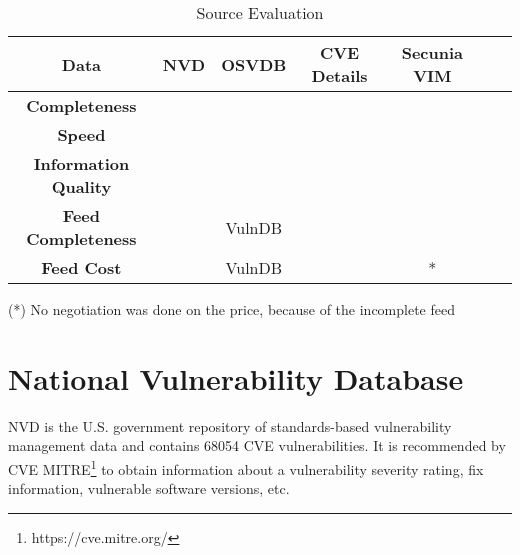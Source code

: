    
    \begin{table}
\begin{center}
    \begin{tabular}{ | c || c | c | c | c | c | c |}
    
    \hline
	 
      Data & \textbf{NVD}  &  \textbf{OSVDB} & \textbf{CVE Details} & \textbf{Secunia VIM} 
	\\ 
	\hline  
	\textbf{Completeness} & \multicolumn{1}{c|}{\cellcolor{yellow!25}\cmark} & \multicolumn{1}{c|}{\cellcolor{green!25}\cmark}
	& \multicolumn{1}{c|}{\cellcolor{yellow!25}\cmark}& \multicolumn{1}{c|}{\cellcolor{yellow!25}\cmark}
    \\ 
	\hline   
	 \textbf{Speed} & \multicolumn{1}{c|}{\cellcolor{green!25}\cmark} & \multicolumn{1}{c|}{\cellcolor{green!25}\cmark}
	& \multicolumn{1}{c|}{\cellcolor{green!25}\cmark}& \multicolumn{1}{c|}{\cellcolor{green!25}\cmark}
	  \\ 
	\hline
	 \textbf{Information Quality} & \multicolumn{1}{c|}{\cellcolor{green!25}\cmark} & \multicolumn{1}{c|}{\cellcolor{green!25}\cmark}
	& \multicolumn{1}{c|}{\cellcolor{green!25}\cmark}& \multicolumn{1}{c|}{\cellcolor{green!25}\cmark}
	  \\ 
	\hline
	 \textbf{Feed Completeness} & \multicolumn{1}{c|}{\cellcolor{green!25}\cmark} & \multicolumn{1}{c|}{\cellcolor{green!25}VulnDB}
	& \multicolumn{1}{c|}{\cellcolor{red!25}\xmark}& \multicolumn{1}{c|}{\cellcolor{red!25}\xmark}
	 \\
	 \hline
	 
	 \textbf{Feed Cost} & \multicolumn{1}{c|}{\cellcolor{green!25}\cmark} & \multicolumn{1}{c|}{\cellcolor{red!25}VulnDB}
	& \multicolumn{1}{c|}{\cellcolor{green!25}\cmark}& \multicolumn{1}{c|}{\cellcolor{white!25}*}
	 \\
	 \hline
     
\end{tabular}
    \caption{Source Evaluation}
    \label{table:source_evaluation}
    \footnotesize{(*) No negotiation was done on the price, because of the incomplete feed}
   \end{center}
    \end{table}


\section{National Vulnerability Database}
NVD is the U.S. government repository of standards-based vulnerability management data and contains 68054 CVE vulnerabilities. It is recommended by CVE MITRE\footnote{https://cve.mitre.org/} to obtain information about a vulnerability severity rating, fix information, vulnerable software versions, etc. 
 
